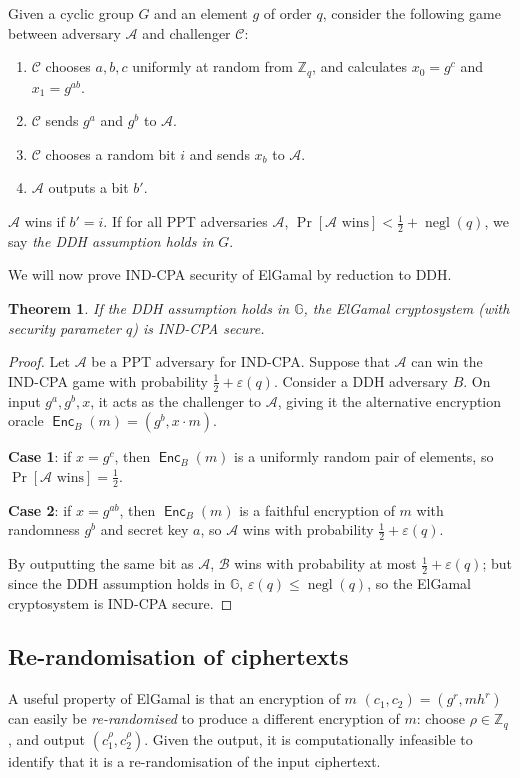 \documentclass[12pt,a4paper]{article}
\DeclareMathOperator{\negl}{\text{negl}}
\DeclareMathOperator{\Enc}{\mathsf{Enc}}
\newtheorem{theorem}{Theorem}
\theoremstyle{definition}
\begin{document}
\begin{definition}
    Given a cyclic group $G$ and an element $g$ of order $q$, consider the following game between adversary $\mathcal{A}$ and challenger $\mathcal{C}$:
    \begin{enumerate}
        \item $\mathcal{C}$ chooses $a, b, c$ uniformly at random from $\mathbb{Z}_q$, and calculates $x_0=g^c$ and $x_1=g^{ab}$.
        \item $\mathcal{C}$ sends $g^a$ and $g^b$ to $\mathcal{A}$.
        \item $\mathcal{C}$ chooses a random bit $i$ and sends $x_b$ to $\mathcal{A}$.
        \item $\mathcal{A}$ outputs a bit $b'$.
    \end{enumerate}
    $\mathcal{A}$ wins if $b' = i$. If for all PPT adversaries $\mathcal{A}$, $\Pr[\mathcal{A}\text{ wins}]<\frac{1}{2}+\negl(q)$, we say \textit{the DDH assumption holds in} $G$.
\end{definition}
We will now prove IND-CPA security of ElGamal by reduction to DDH.
\begin{theorem}
    If the DDH assumption holds in $\mathbb{G}$, the ElGamal cryptosystem (with security parameter $q$) is IND-CPA secure.
\end{theorem}
\begin{proof}
    Let $\mathcal{A}$ be a PPT adversary for IND-CPA. Suppose that $\mathcal{A}$ can win the IND-CPA game with probability $\frac{1}{2}+\varepsilon(q)$. Consider a DDH adversary $B$. On input $g^a, g^b, x$, it acts as the challenger to $\mathcal{A}$, giving it the alternative encryption oracle $\Enc_B(m)=(g^b, x\cdot m)$.
    
    \textbf{Case 1}: if $x=g^c$, then $\Enc_B(m)$ is a uniformly random pair of elements, so $\Pr[\mathcal{A}\text{ wins}]=\frac{1}{2}$.
    
    \textbf{Case 2}: if $x=g^{ab}$, then $\Enc_B(m)$ is a faithful encryption of $m$ with randomness $g^b$ and secret key $a$, so $\mathcal{A}$ wins with probability $\frac{1}{2}+\varepsilon(q)$.

    By outputting the same bit as $\mathcal{A}$, $\mathcal{B}$ wins with probability at most $\frac{1}{2}+\varepsilon(q)$; but since the DDH assumption holds in $\mathbb{G}$, $\varepsilon(q)\leq\negl(q)$, so the ElGamal cryptosystem is IND-CPA secure.
\end{proof}

\subsection{Re-randomisation of ciphertexts}
A useful property of ElGamal is that an encryption of $m$ $(c_1, c_2)=(g^r, mh^r)$ can easily be \textit{re-randomised} to produce a different encryption of $m$: choose $\rho\in\mathbb{Z}_q$, and output $(c_1^\rho, c_2^\rho)$. Given the output, it is computationally infeasible to identify that it is a re-randomisation of the input ciphertext.
\end{document}
